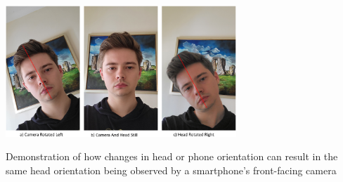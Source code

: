 \begin{CCSXML}

\end{CCSXML}



\begin{teaserfigure}
  \center
  \includegraphics[width=0.65\textwidth]{figures/HeadOrientations.png}
  \caption{Demonstration of how changes in head or phone orientation can result in the same head orientation being observed by a smartphone's front-facing camera}
  \label{fig:teaser}
\end{teaserfigure}

\maketitle





